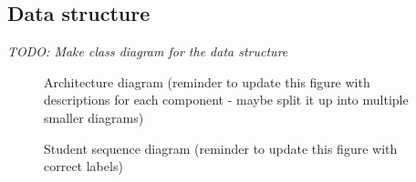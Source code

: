 \subsection{Data structure}
\textit{TODO: Make class diagram for the data structure}

\begin{figure}[H]
  \centering
  \caption{Architecture diagram (reminder to update this figure with descriptions for each component - maybe split it up into multiple smaller diagrams)}
  \label{fig:architecture-diagram}
\end{figure} 

\begin{figure}[H]
  \centering
  \caption{Student sequence diagram (reminder to update this figure with correct labels)}
  \label{fig:sequence-diagram-student}
\end{figure}
